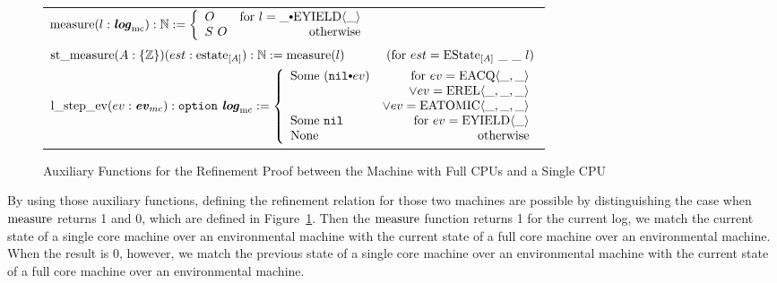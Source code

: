 \begin{figure}
\noindent{}
\begin{center}
\begin{tabular}{l}
$
   \mcmeasurekwd (l : \mclog)  : \nattype :=
     \left\{\begin{array}{lr}
        O & \text{for }  l = \listconsoppo{\yieldev{\_}}{\_} \\
        S \ O & \text{otherwise}\\
        \end{array} \right.$ \\
$ \mcstatemeasurekwd (A : \set{\ztype}) (est : \envstatekwd_{[A]}) : \nattype := \mcmeasurenoeq{l} \ \ \ \ \ \ \ \ \ \ (\text{for } est = \envstate{A}{\_}{\_}{l}) $\\
$ \localstepevkwd (ev : \mcevent) : \optiondef\ \mclog := 
     \left\{\begin{array}{lr}
        \mathrm{Some} \ (\listconsoppo{ev}{\nulllist}) & \text{for }  ev = \acqev{\_}{\_} \\
                                        & \vee  ev= \relev{\_}{\_}{\_} \\
                                        & \vee ev= \atomicev{\_}{\_}{\_} \\
        \mathrm{Some} \ \nulllist & \text{for }  ev = \yieldev{\_} \\
	   \mathrm{None} & \text{otherwise}\\
        \end{array} \right. $ \\
\end{tabular}        
\end{center}
%  
%
\caption{Auxiliary Functions for the  Refinement Proof between the Machine with Full CPUs and a Single CPU}
\label{fig:chapter:conlink:auxiliary-function-for-full-cpus-and-a-single-cpu}
\end{figure}

By using those auxiliary functions, defining the refinement relation for those two machines are possible 
by distinguishing the case when ${\mathrm{measure}}$ returns 1 and 0, which are
 defined in Figure~\ref{fig:chapter:conlink:auxiliary-function-for-full-cpus-and-a-single-cpu}.
Then the ${\mathrm{measure}}$  function returns 1 for the current log,
we match the current state of a single core machine over an environmental machine 
with the current state of a full core machine over an environmental machine.
When the result is 0, however, 
we match the previous state of a single core machine over an environmental machine 
with the current state of a full core machine over an environmental machine. 

